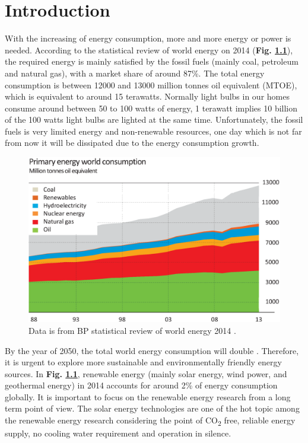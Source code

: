 \documentclass[a4paper, 12pt, titlepage,oneside,drop]{kthesis}
\begin{document}
\newpage
\setcounter{page}{7}
\setcounter{secnumdepth}{3}
\setcounter{tocdepth}{3}
\tableofcontents

\newpage
{}



\chapter{Introduction}

With the increasing of energy consumption, more and more energy or power is needed. According to the statistical review of world energy on 2014 \cite{bp} (\textbf{Fig. \ref{wpec}}),
the required energy is mainly satisfied by the fossil fuels (mainly coal, petroleum and 
natural gas), with a market share of around 87\%. The total energy consumption is between 12000 and 13000 million tonnes oil equivalent (MTOE), which is equivalent to around 15 terawatts. 
Normally light bulbs in our homes consume around between 50 to 100 watts of energy, 1 terawatt implies 10 billion of the 100 watts light bulbs are lighted at the same time. 
Unfortunately, the fossil fuels is very limited energy and non-renewable resources, one day which is not far from  now it will be dissipated due to the energy consumption growth.

\begin{figure}[H]
\centering
\includegraphics[scale=0.4]{energy.eps}
\caption{Data is from BP statistical review of world energy 2014 \cite{bp}.}
\label{wpec}
\end{figure}

By the year of 2050, the total world energy consumption will double \cite{iea}. Therefore, it is urgent to explore more sustainable and environmentally friendly energy sources. In \textbf{Fig. \ref{wpec}},
renewable energy (mainly solar energy, wind power, and geothermal energy) in 2014 accounts for around 2\% of energy consumption globally. It is important to focus on the renewable energy research from a 
long term point of view. The solar energy technologies are one of the hot topic among the renewable energy research considering the point of CO\textsubscript{2} free, reliable energy supply, no cooling water requirement and
operation in silence.
\end{document}
